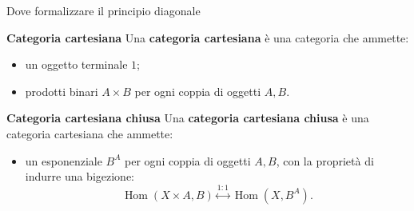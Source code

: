 \documentclass[italian,usepdftitle=false]{beamer}
\DeclareMathOperator{\Hom}{Hom}
\begin{document}
\begin{frame}{Dove formalizzare il principio diagonale}
  \small
  \vspace{1mm}

  \vspace{1mm}
  \begin{block}{\textbf{Categoria cartesiana}}
    Una \textbf{categoria cartesiana} è una categoria che ammette:
    \begin{itemize}
      \item un oggetto terminale $1$;
      \item prodotti binari $A\times B$ per ogni coppia di oggetti $A,B$.
    \end{itemize}
  \end{block}

  \vspace{3mm}
  \begin{block}{\textbf{Categoria cartesiana chiusa}}
    Una \textbf{categoria cartesiana chiusa} è una categoria cartesiana che ammette:
    \begin{itemize}
      \item un esponenziale $B^A$ per ogni coppia di oggetti $A,B$, con la
        proprietà di indurre una bigezione:
        \[
          \Hom(X\times A,B)\overset{1:1}{\longleftrightarrow}\Hom(X,B^A).
        \]
    \end{itemize}
  \end{block}
\end{frame}
\end{document}
